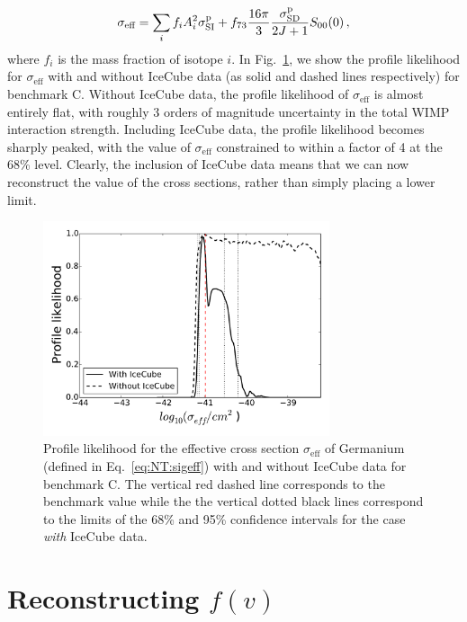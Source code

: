 \begin{equation}
\label{eq:NT:sigeff}
\sigma_\textrm{eff} = \sum_{i} f_i A_i^2 \sigmapsi + f_{73} \frac{16\pi}{3} \frac{\sigmapsd}{2J+1} S_{00}(0)\,,
\end{equation}
where $f_i$ is the mass fraction of isotope $i$. In Fig.~\ref{fig:NT:sigeff}, we show the profile likelihood for $\sigma_\textrm{eff}$ with and without IceCube data (as solid and dashed lines respectively) for benchmark C. Without IceCube data, the profile likelihood of $\sigma_\textrm{eff}$ is almost entirely flat, with roughly 3 orders of magnitude uncertainty in the total WIMP interaction strength. Including IceCube data, the profile likelihood becomes sharply peaked, with the value of $\sigma_\textrm{eff}$ constrained to within a factor of 4 at the 68\% level. Clearly, the inclusion of IceCube data means that we can now reconstruct the value of the cross sections, rather than simply placing a lower limit.

\begin{figure}[!ht]
  \centering
  \includegraphics[width=0.75\textwidth]{NT/final018-sigeff.pdf}
\caption[Profile likelihood for the effective cross section $\sigma_\textrm{eff}$ of Germanium]{Profile likelihood for the effective cross section $\sigma_\textrm{eff}$ of Germanium (defined in Eq.~\ref{eq:NT:sigeff}) with and without IceCube data for benchmark C. The vertical red dashed line corresponds to the benchmark value while the the vertical dotted black lines correspond to the limits of the 68\% and 95\% confidence intervals for the case \textit{with} IceCube data.}
\label{fig:NT:sigeff}
\end{figure}


\section{Reconstructing $f(v)$}
\label{sec:NT:speeddist}

